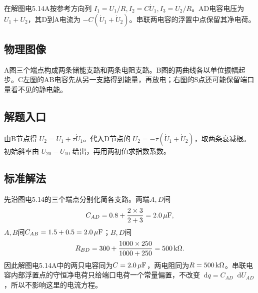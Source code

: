 \documentclass[UTF8,fontset=fandol,a4paper,11pt]{ctexart}
\newcommand{\dd}{\mathop{}\!\mathrm{d}}
\begin{document}
在解图电5.14A按参考方向列 $I_1=U_1/R,I_2=C\dot U_1,I_3=U_2/R$。AD电容电压为 $U_1+U_2$，其D到A电流为 $-C(\dot U_1+\dot U_2)$。串联两电容的浮置中点保留其净电荷。



\subsection*{物理图像}

A图三个端点构成两条储能支路和两条电阻支路。B图的两曲线各以单位振幅起步。C左图的AB电容先从另一支路得到能量，再放电；右图的S点还可能保留端口量看不见的静电能。



\subsection*{解题入口}

由B节点得 $U_2=U_1+\tau\dot U_1$。代入D节点的 $U_2=-\tau(\dot U_1+\dot U_2)$，取两条衰减根。初始斜率由 $U_{20}-U_{10}$ 给出，再用两初值求指数系数。


\subsection*{标准解法}


先沿图电5.14的三个端点分别化简各支路。两端$A,D$间
\[
 C_{AD}=0.8+\frac{2\times3}{2+3}=2.0\,\mu{\rm F},
\]
$A,B$间$C_{AB}=1.5+0.5=2.0\,\mu{\rm F}$；$B,D$间
\[
 R_{BD}=300+\frac{1000\times250}{1000+250}=500\,{\rm k}\Omega.
\]
因此解图电5.14A中的两只电容同为$C=2.0\,\mu{\rm F}$，两电阻同为$R=500\,{\rm k}\Omega$。串联电容内部浮置点的守恒净电荷只给端口电荷一个常量偏置，不改变$\dd q=C_{AD}\dd U_{AD}$，所以不影响这里的电流方程。
\end{document}
